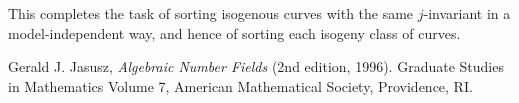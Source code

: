 \documentclass{article}
\begin{document}
This completes the task of sorting isogenous curves with the same
$j$-invariant in a model-independent way, and hence of sorting each
isogeny class of curves.


\begin{thebibliography}{10}
 Gerald J. Jasusz, {\em Algebraic Number Fields} (2nd
  edition, 1996).  Graduate Studies in Mathematics Volume 7, American
  Mathematical Society, Providence, RI.
\end{thebibliography}
\end{document}
